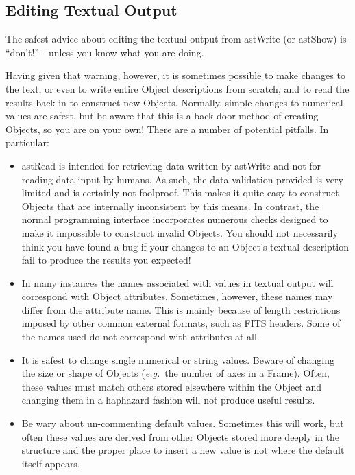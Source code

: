 \documentclass[twoside,11pt]{article}
\newcommand{\htmlref}[2]{#1}
\begin{document}
\subsection{Editing Textual Output}

The safest advice about editing the textual output from \htmlref{astWrite}{astWrite} (or
\htmlref{astShow}{astShow}) is ``don't!''---unless you know what you are doing.

Having given that warning, however, it is sometimes possible to make
changes to the text, or even to write entire \htmlref{Object}{Object} descriptions from
scratch, and to read the results back in to construct new
Objects. Normally, simple changes to numerical values are safest, but
be aware that this is a back door method of creating Objects, so
you are on your own! There are a number of potential pitfalls. In
particular:

\begin{itemize}
\item \htmlref{astRead}{astRead} is intended for retrieving data written by astWrite and
not for reading data input by humans. As such, the data validation
provided is very limited and is certainly not foolproof. This makes it
quite easy to construct Objects that are internally inconsistent by
this means. In contrast, the normal programming interface incorporates
numerous checks designed to make it impossible to construct invalid
Objects. You should not necessarily think you have found a bug if your
changes to an Object's textual description fail to produce the results
you expected!

\item In many instances the names associated with values in textual
output will correspond with Object attributes. Sometimes, however,
these names may differ from the attribute name. This is mainly because
of length restrictions imposed by other common external formats, such
as FITS headers. Some of the names used do not correspond with
attributes at all.

\item It is safest to change single numerical or string values.
Beware of changing the size or shape of Objects ({\em{e.g.}}\ the
number of axes in a \htmlref{Frame}{Frame}). Often, these values must match others
stored elsewhere within the Object and changing them in a haphazard
fashion will not produce useful results.

\item Be wary about un-commenting default values. Sometimes this will
work, but often these values are derived from other Objects stored
more deeply in the structure and the proper place to insert a new
value is not where the default itself appears.
\end{itemize}
\end{document}

